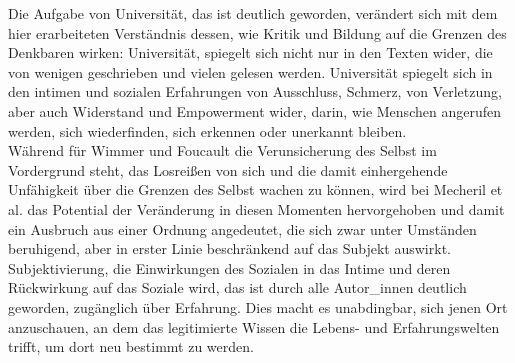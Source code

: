 \noindent Die Aufgabe von Universität, das ist deutlich geworden, verändert sich mit dem
hier erarbeiteten Verständnis dessen, wie Kritik und Bildung auf die Grenzen
des Denkbaren wirken: Universität, spiegelt sich nicht nur in den Texten wider,
die von wenigen geschrieben und vielen gelesen werden. Universität spiegelt
sich in den intimen und sozialen Erfahrungen von Ausschluss, Schmerz, von
Verletzung, aber auch Widerstand und Empowerment wider, darin, wie Menschen
angerufen werden, sich wiederfinden, sich erkennen oder unerkannt bleiben.\\
Während für Wimmer und Foucault die Verunsicherung des Selbst im Vordergrund
steht, das Losreißen von sich und die damit einhergehende Unfähigkeit über die
Grenzen des Selbst wachen zu können, wird bei Mecheril et al. das Potential der
Veränderung in diesen Momenten hervorgehoben und damit ein Ausbruch aus einer
Ordnung angedeutet, die sich zwar unter Umständen beruhigend, aber in erster
Linie beschränkend auf das Subjekt auswirkt.\\ 

\noindent Subjektivierung, die Einwirkungen
des Sozialen in das Intime und deren Rückwirkung auf das Soziale wird, das ist
durch alle Autor\_innen deutlich geworden, zugänglich über Erfahrung. Dies macht
es unabdingbar, sich jenen Ort anzuschauen, an dem das legitimierte Wissen die
Lebens- und Erfahrungswelten trifft, um dort neu bestimmt zu werden.
